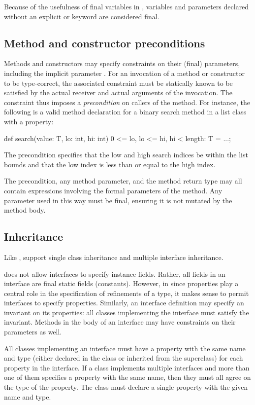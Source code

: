 Because of the usefulness of final variables in \Xten{}, variables
and parameters declared without an explicit  or 
keyword are considered final.

\subsection{Method and constructor preconditions}

Methods and constructors may specify constraints on their
(final) parameters, including the implicit parameter .
For an invocation of a method or constructor to
be type-correct, the associated constraint must be statically known
to be satisfied by the actual receiver and actual arguments of
the invocation.  The constraint thus imposes a \emph{precondition}
on callers of the method.
For instance, the following is a valid method declaration
for a binary search method in a list class with a 
property:
\begin{xtennoindent}
  def search(value: T, lo: int, hi: int)
    {0 <= lo, lo <= hi, hi < length}: T = ...;
\end{xtennoindent}
The precondition
specifies that
the low and high search indices be within the list
bounds and that the low index is less than or equal to the high
index.

The precondition, any method parameter, and the method return
type may all 
contain expressions involving the
formal parameters of the method.  Any parameter used in this way must
be final,
ensuring it is not mutated by the method body.

\subsection{Inheritance}

Like \Java{},
\Xten{} support single class inheritance and multiple
interface inheritance.

\java{} does not allow interfaces to specify instance fields.  Rather, all
fields in an interface are final static fields (constants).
However, in \Xten{}
since properties play a central role in the specification of
refinements of a type, it makes sense to permit interfaces to specify
properties.
Similarly, an interface
definition may specify an invariant on its properties: all
classes implementing the interface must satisfy the invariant.  Methods
in the body of an interface may have constraints on their
parameters as well.

All classes implementing an interface must have a property
with the same name and
type (either declared in the class or inherited from the superclass)
for each property in the interface. If a class implements
multiple interfaces and more than one of them specifies a property
with the same name, then they must all agree on the type of the
property. The class must declare a single property with the given name
and type.

